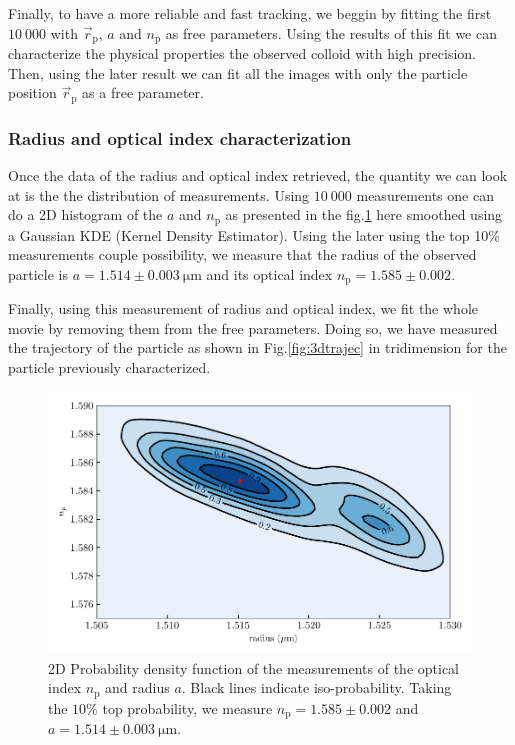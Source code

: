  
 Finally, to have a more reliable and fast tracking, we beggin by fitting the first $10~000$ with  $\vec{r}_\mathrm{p}$, $a$ and $n_\mathrm{p}$ as free parameters. Using the results of this fit we can characterize the physical properties the observed colloid with high precision. Then, using the later result we can fit all the images with only the particle position $\vec{r}_\mathrm{p}	$ as a free parameter.
 



\subsubsection{Radius and optical index characterization}


Once the data of the radius and optical index retrieved, the quantity we can look at is the the distribution of measurements. Using $10 ~ 000$ measurements one can do a 2D histogram of the $a$ and $n_\mathrm{p}$ as presented in the fig.\ref{fig:KDErn} here smoothed using a Gaussian KDE (Kernel Density Estimator). Using the later using the top 10\% measurements couple possibility, we measure that the radius of the observed particle is $a=1.514 \pm 0.003 ~ \mathrm{\mu m} $ and its optical index $n_\mathrm{p} = 1.585 \pm 0.002$.
 




Finally, using this measurement of radius and optical index, we fit the whole movie by removing them from the free parameters. Doing so, we have measured the trajectory of the particle as shown in Fig.\ref{fig:3dtrajec} in tridimension for the particle previously characterized.

\begin{figure}[!ht]
	\centering
	\includegraphics{02_body/chapter2/images/KDErn.pdf}
	\caption{2D Probability density function of the measurements of the optical index $n_\mathrm{p}$ and radius $a$. Black lines indicate iso-probability. Taking the $10\% $ top probability, we measure $n_\mathrm{p} = 1.585 \pm 0.002$ and $a=1.514 \pm 0.003 ~ \mathrm{\mu m}$. }
	\label{fig:KDErn}
\end{figure}

